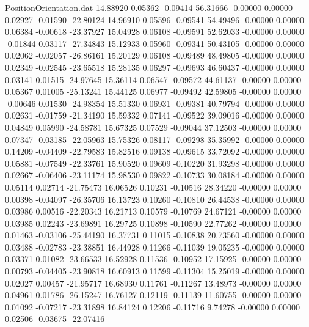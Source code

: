 \begin{filecontents}{PositionOrientation.dat}
  14.88920    0.05362   -0.09414    56.31666   -0.00000    0.00000    0.02927   -0.01590  -22.80124
  14.96910    0.05596   -0.09541    54.49496   -0.00000    0.00000    0.06384   -0.00618  -23.37927
  15.04928    0.06108   -0.09591    52.62033   -0.00000    0.00000   -0.01844    0.03117  -27.34843
  15.12933    0.05960   -0.09341    50.43105   -0.00000    0.00000    0.02062   -0.02057  -26.86161
  15.20129    0.06108   -0.09489    48.49805   -0.00000    0.00000    0.02349   -0.02545  -23.65518
  15.28135    0.06297   -0.09693    46.60437   -0.00000    0.00000    0.03141    0.01515  -24.97645
  15.36114    0.06547   -0.09572    44.61137   -0.00000    0.00000    0.05367    0.01005  -25.13241
  15.44125    0.06977   -0.09492    42.59805   -0.00000    0.00000   -0.00646    0.01530  -24.98354
  15.51330    0.06931   -0.09381    40.79794   -0.00000    0.00000    0.02631   -0.01759  -21.34190
  15.59332    0.07141   -0.09522    39.09016   -0.00000    0.00000    0.04849    0.05990  -24.58781
  15.67325    0.07529   -0.09044    37.12503   -0.00000    0.00000    0.07347   -0.03185  -22.05963
  15.75326    0.08117   -0.09298    35.35992   -0.00000    0.00000    0.14209   -0.04409  -22.79583
  15.82516    0.09138   -0.09615    33.72092   -0.00000    0.00000    0.05881   -0.07549  -22.33761
  15.90520    0.09609   -0.10220    31.93298   -0.00000    0.00000    0.02667   -0.06406  -23.11174
  15.98530    0.09822   -0.10733    30.08184   -0.00000    0.00000    0.05114    0.02714  -21.75473
  16.06526    0.10231   -0.10516    28.34220   -0.00000    0.00000    0.00398   -0.04097  -26.35706
  16.13723    0.10260   -0.10810    26.44538   -0.00000    0.00000    0.03986    0.00516  -22.20343
  16.21713    0.10579   -0.10769    24.67121   -0.00000    0.00000    0.03985    0.02243  -23.69891
  16.29725    0.10898   -0.10590    22.77262   -0.00000    0.00000    0.01463   -0.03106  -25.44190
  16.37731    0.11015   -0.10838    20.73560   -0.00000    0.00000    0.03488   -0.02783  -23.38851
  16.44928    0.11266   -0.11039    19.05235   -0.00000    0.00000    0.03371    0.01082  -23.66533
  16.52928    0.11536   -0.10952    17.15925   -0.00000    0.00000    0.00793   -0.04405  -23.90818
  16.60913    0.11599   -0.11304    15.25019   -0.00000    0.00000    0.02027    0.00457  -21.95717
  16.68930    0.11761   -0.11267    13.48973   -0.00000    0.00000    0.04961    0.01786  -26.15247
  16.76127    0.12119   -0.11139    11.60755   -0.00000    0.00000    0.01092   -0.07217  -23.31898
  16.84124    0.12206   -0.11716     9.74278   -0.00000    0.00000    0.02506   -0.03675  -22.07416

\end{filecontents}
